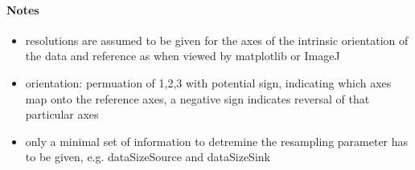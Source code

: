 \documentclass[letterpaper,10pt,english]{sphinxmanual}
\begin{document}
\begin{fulllineitems}
\paragraph{Notes}
\begin{itemize}
\item {} 
resolutions are assumed to be given for the axes of the intrinsic
orientation of the data and reference as when viewed by matplotlib or ImageJ

\item {} 
orientation: permuation of 1,2,3 with potential sign, indicating which
axes map onto the reference axes, a negative sign indicates reversal
of that particular axes

\item {} 
only a minimal set of information to detremine the resampling parameter
has to be given, e.g. dataSizeSource and dataSizeSink

\end{itemize}

\end{fulllineitems}

\end{document}
